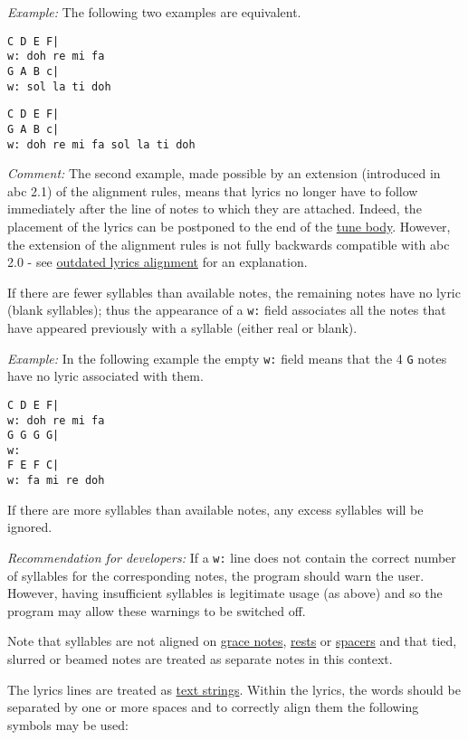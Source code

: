 \emph{Example:} The following two examples are equivalent.

\begin{verbatim}
C D E F|
w: doh re mi fa
G A B c|
w: sol la ti doh
\end{verbatim}

\begin{verbatim}
C D E F|
G A B c|
w: doh re mi fa sol la ti doh
\end{verbatim}

\emph{Comment:} The second example, made possible by an extension
(introduced in abc 2.1) of the alignment rules, means that lyrics no
longer have to follow immediately after the line of notes to which they
are attached. Indeed, the placement of the lyrics can be postponed to
the end of the \protect\hyperlink{tune_body_definition}{tune body}.
However, the extension of the alignment rules is not fully backwards
compatible with abc 2.0 - see
\protect\hyperlink{outdated_lyrics_alignment}{outdated lyrics alignment}
for an explanation.

If there are fewer syllables than available notes, the remaining notes
have no lyric (blank syllables); thus the appearance of a \texttt{w:}
field associates all the notes that have appeared previously with a
syllable (either real or blank).

\emph{Example:} In the following example the empty \texttt{w:} field
means that the 4 \texttt{G} notes have no lyric associated with them.

\begin{verbatim}
C D E F|
w: doh re mi fa
G G G G|
w:
F E F C|
w: fa mi re doh
\end{verbatim}

If there are more syllables than available notes, any excess syllables
will be ignored.

\emph{Recommendation for developers:} If a \texttt{w:} line does not
contain the correct number of syllables for the corresponding notes, the
program should warn the user. However, having insufficient syllables is
legitimate usage (as above) and so the program may allow these warnings
to be switched off.

Note that syllables are not aligned on
\protect\hyperlink{grace_notes}{grace notes},
\protect\hyperlink{rests}{rests} or
\protect\hyperlink{typesetting_extra_space}{spacers} and that tied,
slurred or beamed notes are treated as separate notes in this context.

The lyrics lines are treated as
\protect\hyperlink{text_string_definition}{text strings}. Within the
lyrics, the words should be separated by one or more spaces and to
correctly align them the following symbols may be used:

